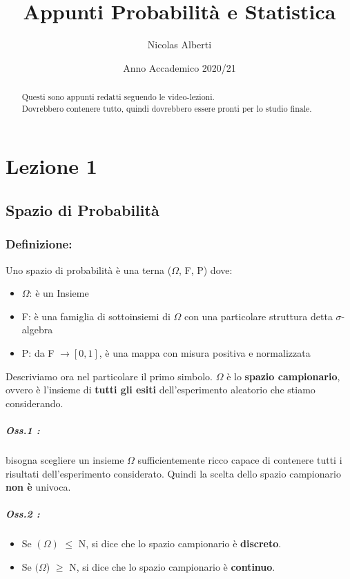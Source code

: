 \documentclass{report}
\title{Appunti Probabilità e Statistica}
\author{Nicolas Alberti}
\date{Anno Accademico 2020/21}
\begin{document}
\maketitle
\begin{abstract}
    Questi sono appunti redatti seguendo le video-lezioni. \\
    Dovrebbero contenere tutto, quindi dovrebbero essere pronti per lo studio finale.
\end{abstract}
\tableofcontents

\chapter{Lezione 1}

\section{Spazio di Probabilità}

\subsection{Definizione:}

Uno spazio di probabilità è una terna (\(\Omega\), F, P) dove:

\begin{itemize}
    \item \(\Omega\): è un Insieme
    \item F: è una famiglia di sottoinsiemi di \(\Omega\) con una particolare struttura detta \(\sigma\)-algebra
    \item P: da F \(\xrightarrow{}[0, 1]\), è una mappa con misura positiva e normalizzata
\end{itemize}

Descriviamo ora nel particolare il primo simbolo.
\(\Omega\) è lo \textbf{spazio campionario}, ovvero è l'insieme di \textbf{tutti gli esiti} dell'esperimento aleatorio che stiamo considerando.
    \paragraph{Oss.1 :} bisogna scegliere un insieme \(\Omega\) sufficientemente ricco capace di contenere tutti i risultati dell'esperimento considerato. Quindi la scelta dello spazio campionario \textbf{non è} univoca. \\
    \paragraph{Oss.2 :}\begin{itemize}
        \item Se \((\Omega)\) \(\leq\) \(\mathrm{N}\), si dice che lo spazio campionario è \textbf{discreto}.
        \item Se \((\Omega\)) \(\geq\) \(\mathrm{N}\), si dice che lo spazio campionario è \textbf{continuo}.
    \end{itemize}
\end{document}

